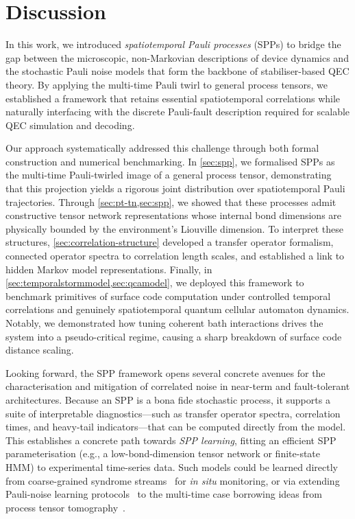 \section{Discussion}\label{sec:discussion}
In this work, we introduced \emph{spatiotemporal Pauli processes} (SPPs) to bridge the gap between the microscopic, non-Markovian descriptions of device dynamics and the stochastic Pauli noise models that form the backbone of stabiliser-based QEC theory. By applying the multi-time Pauli twirl to general process tensors, we established a framework that retains essential spatiotemporal correlations while naturally interfacing with the discrete Pauli-fault description required for scalable QEC simulation and decoding.

Our approach systematically addressed this challenge through both formal construction and numerical benchmarking. In \cref{sec:spp}, we formalised SPPs as the multi-time Pauli-twirled image of a general process tensor, demonstrating that this projection yields a rigorous joint distribution over spatiotemporal Pauli trajectories. Through \cref{sec:pt-tn,sec:spp}, we showed that these processes admit constructive tensor network representations whose internal bond dimensions are physically bounded by the environment's Liouville dimension. To interpret these structures, \cref{sec:correlation-structure} developed a transfer operator formalism, connected operator spectra to correlation length scales, and established a link to hidden Markov model representations. Finally, in \cref{sec:temporalstormmodel,sec:qcamodel}, we deployed this framework to benchmark primitives of surface code computation under controlled temporal correlations and genuinely spatiotemporal quantum cellular automaton dynamics. Notably, we demonstrated how tuning coherent bath interactions drives the system into a pseudo-critical regime, causing a sharp breakdown of surface code distance scaling.

Looking forward, the SPP framework opens several concrete avenues for the characterisation and mitigation of correlated noise in near-term and fault-tolerant architectures. Because an SPP is a bona fide stochastic process, it supports a suite of interpretable diagnostics---such as transfer operator spectra, correlation times, and heavy-tail indicators---that can be computed directly from the model. This establishes a concrete path towards \emph{SPP learning}, fitting an efficient SPP parameterisation (e.g., a low-bond-dimension tensor network or finite-state HMM) to experimental time-series data. Such models could be learned directly from coarse-grained syndrome streams~\cite{wagnerOptimalNoiseEstimation2021,wagnerPauliChannelsCan2022} for \emph{in situ} monitoring, or via extending Pauli-noise learning protocols~\cite{erhardCharacterizingLargescaleQuantum2019,flammiaEfficientEstimationPauli2020,harperLearningCorrelatedNoise2023,hockingsScalableNoiseCharacterization2025} to the multi-time case borrowing ideas from process tensor tomography~\cite{whiteNonMarkovianQuantumProcess2022,whiteUnifyingNonMarkovianCharacterization2025}.

